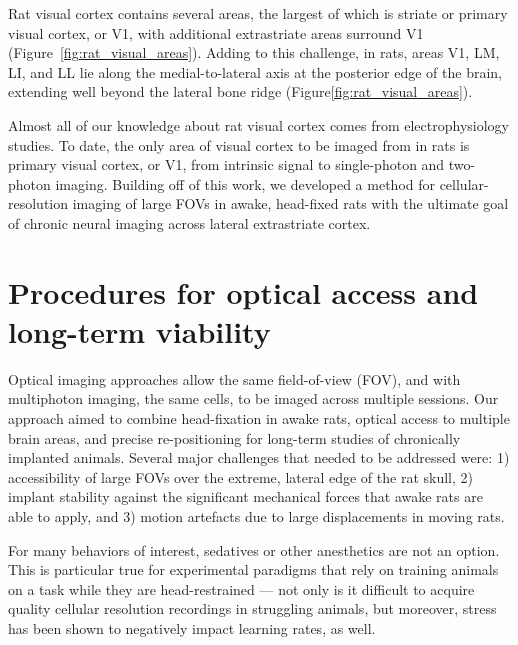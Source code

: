 Rat visual cortex contains several areas, the largest of which is striate or primary visual cortex, or V1, with additional extrastriate areas surround V1 \cite{Espinoza1983RetinotopicRat, Sereno1991} (Figure~\ref{fig:rat_visual_areas}). Adding to this challenge, in rats, areas V1, LM, LI, and LL lie along the medial-to-lateral axis at the posterior edge of the brain, extending well beyond the lateral bone ridge (Figure\ref{fig:rat_visual_areas}). 

Almost all of our knowledge about rat visual cortex comes from electrophysiology studies. To date, the only area of visual cortex to be imaged from in rats is primary visual cortex, or V1, from intrinsic signal \cite{Gias2004} to single-photon \cite{Scott2018ImagingMacroscope} and two-photon \cite{Ohki2005, Greenberg2008} imaging. Building off of this work, we developed a method for cellular-resolution imaging of large FOVs in awake, head-fixed rats with the ultimate goal of chronic neural imaging across lateral extrastriate cortex. 

\section{Procedures for optical access and long-term viability} 

Optical imaging approaches allow the same field-of-view (FOV), and with multiphoton imaging, the same cells, to be imaged across multiple sessions. Our approach aimed to combine head-fixation in awake rats, optical access to multiple brain areas, and precise re-positioning for long-term studies of chronically implanted animals. Several major challenges that needed to be addressed were:  1) accessibility of large FOVs over the extreme, lateral edge of the rat skull, 2) implant stability against the significant mechanical forces that awake rats are able to apply, and 3) motion artefacts due to large displacements in moving rats. 

For many behaviors of interest, sedatives or other anesthetics are not an option. This is particular true for experimental paradigms that rely on training animals on a task while they are head-restrained --- not only is it difficult to acquire quality cellular resolution recordings in struggling animals, but moreover, stress has been shown to negatively impact learning rates, as well\cite{REFREF}. 

